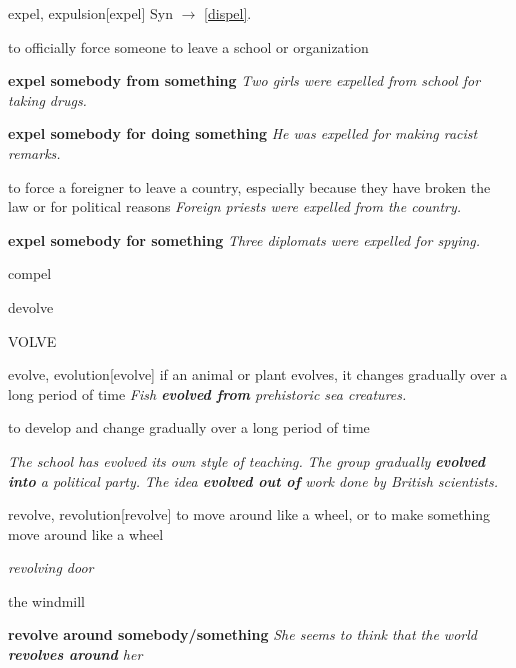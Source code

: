 \begin{word}{expel, expulsion}[expel]
    Syn $\rightarrow$ \ref{dispel}.

    to officially force someone to leave a school or organization
    
    \textbf{expel somebody from something}
    \textit{Two girls were expelled from school for taking drugs.}

    \textbf{expel somebody for doing something}
    \textit{He was expelled for making racist remarks.}

    to force a foreigner to leave a country, especially because they have broken the law or for political reasons
    \textit{Foreign priests were expelled from the country.}

    \textbf{expel somebody for something}
    \textit{Three diplomats were expelled for spying.}
\end{word}

\begin{word}{compel}
\end{word}


\begin{word}{devolve}
\end{word}

\begin{word}{VOLVE}
\end{word}

\begin{word}{evolve, evolution}[evolve]
    if an animal or plant evolves, it changes gradually over a long period of time
    \textit{Fish \textbf{evolved from} prehistoric sea creatures.}

    to develop and change gradually over a long period of time

    \textit{The school has evolved its own style of teaching.}
    \textit{The group gradually \textbf{evolved into} a political party.}
    \textit{The idea \textbf{evolved out of} work done by British scientists.}
\end{word}

\begin{word}{revolve, revolution}[revolve]
    to move around like a wheel, or to make something move around like a wheel

    \textit{revolving door}

    the windmill

    \textbf{revolve around somebody/something} 
    \textit{She seems to think that the world \textbf{revolves around} her}
\end{word}